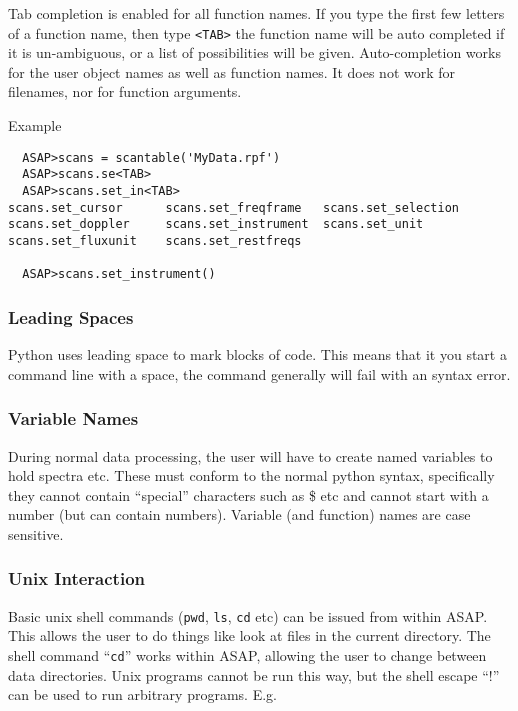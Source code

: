 \documentclass[11pt]{article}
\newcommand{\cmd}[1]{{\tt #1}}
\begin{document}
Tab completion is enabled for all
function names. If you type the first few letters of a function name,
then type {\tt <TAB>} the function name will be auto completed if it
is un-ambiguous, or a list of possibilities will be
given. Auto-completion works for the user object names as well as
function names. It does not work for filenames, nor for function
arguments.

Example
\begin{verbatim}
  ASAP>scans = scantable('MyData.rpf')
  ASAP>scans.se<TAB>
  ASAP>scans.set_in<TAB>
scans.set_cursor      scans.set_freqframe   scans.set_selection
scans.set_doppler     scans.set_instrument  scans.set_unit
scans.set_fluxunit    scans.set_restfreqs

  ASAP>scans.set_instrument()
\end{verbatim}

\subsubsection{Leading Spaces}

Python uses leading space to mark blocks
of code. This means that it you start a command line with a space, the
command generally will fail with an syntax error.

\subsubsection{Variable Names}

During normal data processing, the user
will have to create named variables to hold spectra etc. These must
conform to the normal python syntax, specifically they cannot contain
``special'' characters such as \@ \$ etc and cannot start with a
number (but can contain numbers).  Variable (and function) names are
case sensitive.

\subsubsection{Unix Interaction}

Basic unix shell commands (\cmd{pwd},
\cmd{ls}, \cmd{cd} etc) can be issued from within ASAP. This allows
the user to do things like look at files in the current directory. The
shell command ``\cmd{cd}'' works within ASAP, allowing the user to
change between data directories. Unix programs cannot be run this way,
but the shell escape ``$!$'' can be used to run arbitrary
programs. E.g.
\end{document}

